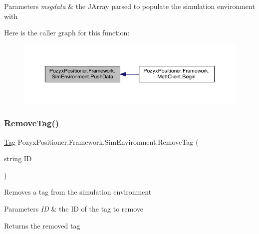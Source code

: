 \begin{DoxyParams}{Parameters}
{\em msgdata} & the J\+Array parsed to populate the simulation environment with\\
\hline
\end{DoxyParams}
Here is the caller graph for this function\+:\nopagebreak
\begin{figure}[H]
\begin{center}
\leavevmode
\includegraphics[width=350pt]{class_pozyx_positioner_1_1_framework_1_1_sim_environment_a94e341475ddb03c2c27dd253748ad65a_icgraph}
\end{center}
\end{figure}
\mbox{\label{class_pozyx_positioner_1_1_framework_1_1_sim_environment_aa69448aa9bc85a646b57b753f5c5e483}} 
\subsubsection{\texorpdfstring{Remove\+Tag()}{RemoveTag()}}
{\footnotesize\ttfamily \hyperlink{class_pozyx_positioner_1_1_framework_1_1_tag}{Tag} Pozyx\+Positioner.\+Framework.\+Sim\+Environment.\+Remove\+Tag (\begin{DoxyParamCaption}\item[{string}]{ID }\end{DoxyParamCaption})}



Removes a tag from the simulation environment 


\begin{DoxyParams}{Parameters}
{\em ID} & the ID of the tag to remove\\
\hline
\end{DoxyParams}
\begin{DoxyReturn}{Returns}
the removed tag 
\end{DoxyReturn}
\mbox{\label{class_pozyx_positioner_1_1_framework_1_1_sim_environment_a0d114a29811d19d1376273cb078f6f61}} 
